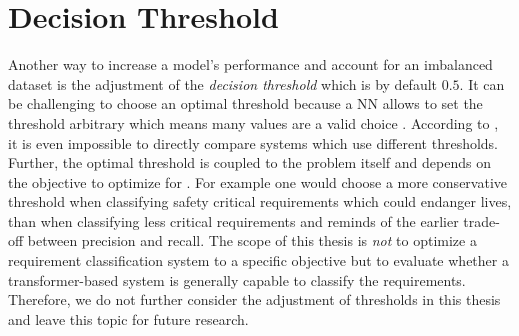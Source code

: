 \section{Decision Threshold}
\label{chp:future_work:sec:decision_threshold}
Another way to increase a model's performance and account for an imbalanced dataset is the adjustment of the \textit{decision threshold} which is by default $0.5$.
It can be challenging to choose an optimal threshold because a \ac{NN} allows to set the threshold arbitrary which means many values are a valid choice \parencite{Mazurowski:2008}.
According to \textcite{Mazurowski:2008}, it is even impossible to directly compare systems which use different thresholds.
Further, the optimal threshold is coupled to the problem itself and depends on the objective to optimize for \parencite{Brown:2019}.
For example one would choose a more conservative threshold when classifying safety critical requirements which could endanger lives, than when classifying less critical requirements and reminds of the earlier trade-off between precision and recall.
The scope of this thesis is \textit{not} to optimize a requirement classification system to a specific objective but to evaluate whether a transformer-based system is generally capable to classify the requirements.
Therefore, we do not further consider the adjustment of thresholds in this thesis and leave this topic for future research.
